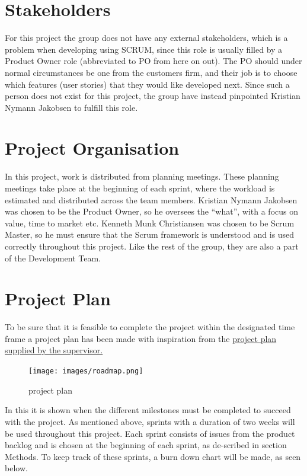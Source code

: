 \section{Stakeholders}
For this project the group does not have any external stakeholders, which is a
problem when developing using SCRUM, since this role is usually filled by a
Product Owner role (abbreviated to PO from here on out). The PO should under
normal circumstances be one from the customers firm, and their job is to choose
which features (user stories) that they would like developed next. Since such a
person does not exist for this project, the group have instead pinpointed
Kristian Nymann Jakobsen to fulfill this role.

\section{Project Organisation}
In this project, work is distributed from planning meetings. These planning
meetings take place at the beginning of each sprint, where the workload is
estimated and distributed across the team members. Kristian Nymann Jakobsen was chosen to be the
Product Owner, so he oversees the “what”, with a focus on value, time to market
etc. Kenneth Munk Christiansen was chosen to be Scrum Master, so he must ensure that the Scrum
framework is understood and is used correctly throughout this project. Like the
rest of the group, they are also a part of the Development Team.

\section{Project Plan}
To be sure that it is feasible to complete the project within the designated
time frame a project plan has been made with inspiration from the
\href{https://docs.google.com/spreadsheets/d/1mZXxgDiwWwWpSyaQmMcafTjvXa2lQriszwTyt-Pf5BA/edit#gid=0}{project plan supplied by the supervisor.}

\begin{figure}[ht]
\centering 
\texttt{[image: images/roadmap.png]}
\label{figure:project_plan}
\caption{project plan} 
\end{figure}

In this it is shown when the different milestones must be completed to succeed
with the project. As mentioned above, sprints with a duration of two weeks will
be used throughout this project. Each sprint consists of issues from the product
backlog and is chosen at the beginning of each sprint, as de-scribed in section
Methods. To keep track of these sprints, a burn down chart will be made, as seen
below.

